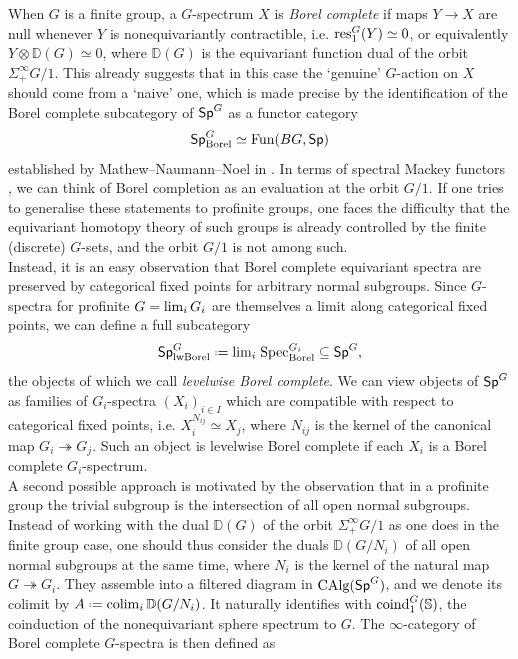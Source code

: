 \documentclass[reqno]{amsart}
\numberwithin{equation}{section}\theoremstyle{thms}
\theoremstyle{defn}
\newcommand{\bD}{\mathbb{D}}
\newcommand{\bS}{\mathbb{S}}
\newcommand{\tn}[1]{\textnormal{#1}}
\newcommand{\tsf}[1]{\textsf{\textup{#1}}}
\newcommand*{\defeq}{\mathrel{\vcenter{\baselineskip0.4ex \lineskiplimit0pt
\hbox{\scriptsize.}\hbox{\scriptsize.}}}%
=}
\newcommand{\fun}{\tn{Fun}}
\newcommand{\calg}{\tn{CAlg}}
\newcommand{\Spec}{\tn{Spec}}
\newcommand{\spec}{\tsf{Sp}}
\newcommand{\specg}{\tsf{Sp}^G}
\begin{document}
\noindent When $G$ is a finite group, a $G$-spectrum $X$ is \emph{Borel complete} if maps $Y \to X$ are null whenever $Y$ is nonequivariantly contractible, i.e. $\tn{res}^G_1(Y) \simeq 0$, or equivalently $Y \otimes \bD(G) \simeq 0$, where $\bD(G)$ is the equivariant function dual of the orbit $\Sigma^{\infty}_+G/1$. This already suggests that in this case the `genuine' $G$-action on $X$ should come from a `naive' one, which is made precise by the identification of the Borel complete subcategory of $\specg$ as a functor category
$$\specg_{\tn{Borel}} \simeq \fun(BG,\spec)$$
established by Mathew--Naumann--Noel in \cite[§6.3]{mnn17}. In terms of spectral Mackey functors \cite{bar17}, we can think of Borel completion as an evaluation at the orbit $G/1$. If one tries to generalise these statements to profinite groups, one faces the difficulty that the equivariant homotopy theory of such groups is already controlled by the finite (discrete) $G$-sets, and the orbit $G/1$ is not among such. \\
Instead, it is an easy observation that Borel complete equivariant spectra are preserved by categorical fixed points for arbitrary normal subgroups. Since $G$-spectra for profinite $G=\tn{lim}_i \, G_i$ are themselves a limit along categorical fixed points, we can define a full subcategory
$$\specg_{\tn{lwBorel}} \defeq \tn{lim}_i \; \Spec^{G_i}_{\tn{Borel}} \subseteq \specg,$$
the objects of which we call \emph{levelwise Borel complete}. We can view objects of $\specg$ as families of $G_i$-spectra $(X_i)_{i \in I}$ which are compatible with respect to categorical fixed points, i.e. $X_i^{N_{ij}} \simeq X_j$, where $N_{ij}$ is the kernel of the canonical map $G_i \twoheadrightarrow G_j$. Such an object is levelwise Borel complete if each $X_i$ is a Borel complete $G_i$-spectrum.\\
A second possible approach is motivated by the observation that in a profinite group the trivial subgroup is the intersection of all open normal subgroups. Instead of working with the dual $\bD(G)$ of the orbit $\Sigma^{\infty}_+G/1$ as one does in the finite group case, one should thus consider the duals $\bD(G/N_i)$ of all open normal subgroups at the same time, where $N_i$ is the kernel of the natural map $G \twoheadrightarrow G_i$. They assemble into a filtered diagram in $\calg(\specg)$, and we denote its colimit by $A \defeq \tn{colim}_i \, \bD(G/N_i)$. It naturally identifies with $\tn{coind}^G_1(\bS)$, the coinduction of the nonequivariant sphere spectrum to $G$. The $\infty$-category of Borel complete $G$-spectra is then defined as
\end{document}

